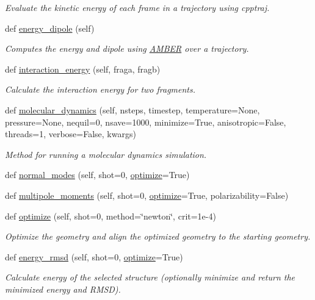 \begin{DoxyCompactItemize}
\begin{DoxyCompactList}\small\item\em Evaluate the kinetic energy of each frame in a trajectory using cpptraj. \end{DoxyCompactList}\item 
def \hyperlink{classsrc_1_1amberio_1_1AMBER_ad1b30b32523e26cb14482970359d0e61}{energy\+\_\+dipole} (self)
\begin{DoxyCompactList}\small\item\em Computes the energy and dipole using \hyperlink{classsrc_1_1amberio_1_1AMBER}{A\+M\+B\+ER} over a trajectory. \end{DoxyCompactList}\item 
def \hyperlink{classsrc_1_1amberio_1_1AMBER_ade6dad11e3a95b62a2d708b1ac2b6456}{interaction\+\_\+energy} (self, fraga, fragb)
\begin{DoxyCompactList}\small\item\em Calculate the interaction energy for two fragments. \end{DoxyCompactList}\item 
def \hyperlink{classsrc_1_1amberio_1_1AMBER_a8fa5737ac517637eeb8b53426eba46dd}{molecular\+\_\+dynamics} (self, nsteps, timestep, temperature=None, pressure=None, nequil=0, nsave=1000, minimize=True, anisotropic=False, threads=1, verbose=False, kwargs)
\begin{DoxyCompactList}\small\item\em Method for running a molecular dynamics simulation. \end{DoxyCompactList}\item 
def \hyperlink{classsrc_1_1amberio_1_1AMBER_a6ca7af7847306ec7c8e62eddf1900f93}{normal\+\_\+modes} (self, shot=0, \hyperlink{classsrc_1_1amberio_1_1AMBER_a51ec039c6c984fa79e83be0d0c71a5b7}{optimize}=True)
\item 
def \hyperlink{classsrc_1_1amberio_1_1AMBER_a9f9f42962721c5cf9b62f80eaffe58c1}{multipole\+\_\+moments} (self, shot=0, \hyperlink{classsrc_1_1amberio_1_1AMBER_a51ec039c6c984fa79e83be0d0c71a5b7}{optimize}=True, polarizability=False)
\item 
def \hyperlink{classsrc_1_1amberio_1_1AMBER_a51ec039c6c984fa79e83be0d0c71a5b7}{optimize} (self, shot=0, method=\char`\"{}newton\char`\"{}, crit=1e-\/4)
\begin{DoxyCompactList}\small\item\em Optimize the geometry and align the optimized geometry to the starting geometry. \end{DoxyCompactList}\item 
def \hyperlink{classsrc_1_1amberio_1_1AMBER_a65250844e95082487cc7507785103e83}{energy\+\_\+rmsd} (self, shot=0, \hyperlink{classsrc_1_1amberio_1_1AMBER_a51ec039c6c984fa79e83be0d0c71a5b7}{optimize}=True)
\begin{DoxyCompactList}\small\item\em Calculate energy of the selected structure (optionally minimize and return the minimized energy and R\+M\+SD). \end{DoxyCompactList}\end{DoxyCompactItemize}
